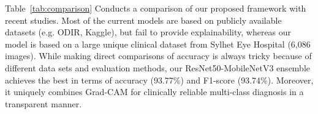 \documentclass[conference]{IEEEtran}
\begin{document}
{{Table~\ref{tab:comparison} Conducts a comparison of our proposed framework with recent studies. Most of the current models are based on publicly available datasets (e.g. ODIR, Kaggle), but fail to provide explainability, whereas our model is based on a large unique clinical dataset from Sylhet Eye Hospital (6,086 images). While making direct comparisons of accuracy is always tricky because of different data sets and evaluation methods, our ResNet50-MobileNetV3 ensemble achieves the best in terms of accuracy (93.77\%) and F1-score (93.74\%). Moreover, it uniquely combines Grad-CAM for clinically reliable multi-class diagnosis in a transparent manner.
\begin{table}[!ht]
\centering
\caption{Comparison with recent studies.}
\label{tab:comparison}
\renewcommand{\arraystretch}{1.5}
\setlength{\tabcolsep}{4pt}
\end{table}

}}
\end{document}
